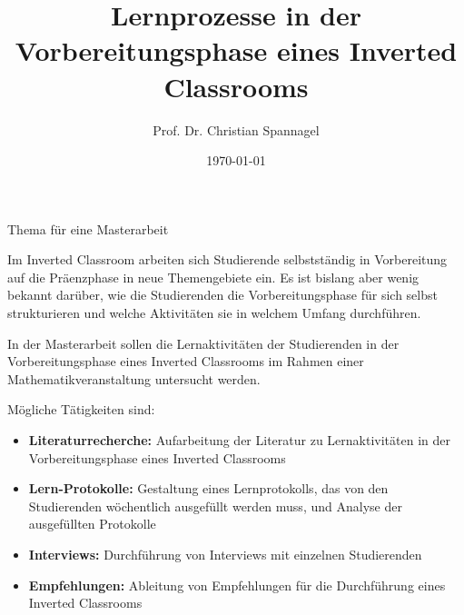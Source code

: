 \documentclass{../cssheet}
\title{Lernprozesse in der Vorbereitungsphase eines Inverted Classrooms}
\author{Prof. Dr. Christian Spannagel}
\date{\today}
\begin{document}
\vspace*{5mm}
\begin{center}
{\Large Thema für eine Masterarbeit}
\end{center}

\printtitle
\vspace*{1cm}

Im Inverted Classroom arbeiten sich Studierende selbstständig in Vorbereitung auf die Präenzphase in neue Themengebiete ein. Es ist bislang aber wenig bekannt darüber, wie die Studierenden die Vorbereitungsphase für sich selbst strukturieren und welche Aktivitäten sie in welchem Umfang durchführen.

In der Masterarbeit sollen die Lernaktivitäten der Studierenden in der Vorbereitungsphase eines Inverted Classrooms im Rahmen einer Mathematikveranstaltung untersucht werden. 

Mögliche Tätigkeiten sind:
\begin{itemize}
\item \textbf{Literaturrecherche:} Aufarbeitung der Literatur zu Lernaktivitäten in der Vorbereitungsphase eines Inverted Classrooms
\item  \textbf{Lern-Protokolle:} Gestaltung eines Lernprotokolls, das von den Studierenden wöchentlich ausgefüllt werden muss, und Analyse der ausgefüllten Protokolle
\item  \textbf{Interviews:} Durchführung von Interviews mit einzelnen Studierenden
\item \textbf{Empfehlungen:} Ableitung von Empfehlungen für die Durchführung eines Inverted Classrooms
\end{itemize}

\vspace*{10mm}

\printlicense

\printsocials
\end{document}

